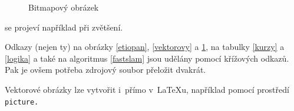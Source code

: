 \documentclass[a4paper, 11pt]{article}
\begin{document}
	\begin{figure}[h]
		\centering
		\caption{Bitmapový obrázek}
		\label{rastrovy}
	\end{figure}
	\bigskip
\noindent se projeví například při zvětšení.

Odkazy (nejen ty) na obrázky \ref{etiopan}, \ref{vektorovy} a \ref{rastrovy}, na tabulky \ref{kurzy} a \ref{logika} a také na algoritmus \ref{fastslam} jsou udělány pomocí křížových odkazů. Pak je ovšem potřeba zdrojový soubor přeložit dvakrát.

Vektorové obrázky lze vytvořit i~přímo v~{\LaTeX}u, například pomocí prostředí\texttt{ picture.}
\end{document}
